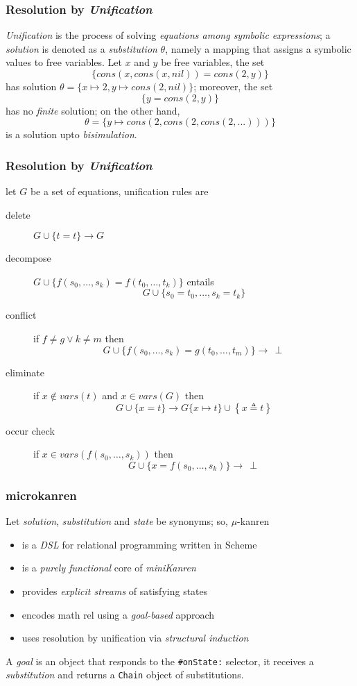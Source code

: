 \documentclass{beamer}
\begin{document}
\begin{frame}[fragile]
\frametitle{Resolution by \textit{Unification}}

\textit{Unification} is the process of solving \textit{equations among symbolic
expressions}; a \textit{solution} is denoted as a \textit{substitution}
$\theta$, namely a mapping that assigns a symbolic values to free variables.
\vfill
Let $x$ and $y$ be free variables, the set
$$\lbrace cons(x,cons(x,nil)) = cons(2,y)\rbrace$$
has solution $\theta = \lbrace x \mapsto 2, y \mapsto cons(2,nil) \rbrace$;
moreover, the set
$$ \lbrace y = cons(2,y) \rbrace $$
has no \textit{finite} solution; on the other hand,
$$\theta = \lbrace y \mapsto cons(2,cons(2,cons(2,...))) \rbrace$$
is a solution upto \textit{bisimulation}.
\end{frame}

\begin{frame}[fragile]
\frametitle{Resolution by \textit{Unification}}
let $G$ be a set of equations, unification rules are
\begin{description}
\item[delete] $G \cup \lbrace t = t \rbrace \rightarrow G$
\item[decompose] $G \cup \lbrace f(s_{0}, \ldots, s_{k}) = f(t_{0}, \ldots, t_{k})\rbrace$ entails
$$G \cup \lbrace s_{0}=t_{0},\ldots, s_{k}=t_{k} \rbrace$$
\item[conflict] if $f\neq g \vee k\neq m$ then $$G \cup \lbrace f(s_{0}, \ldots, s_{k}) = g(t_{0}, \ldots, t_{m})\rbrace \rightarrow \,\perp$$
\item[eliminate] if $x \not\in vars(t)$ and $x \in vars(G)$ then $$G \cup \lbrace x = t\rbrace \rightarrow G\lbrace x \mapsto t\rbrace \cup \left\lbrace x \triangleq t\right\rbrace $$
\item[occur check] if $x \in vars(f(s_{0},\ldots,s_{k}))$ then $$G \cup \lbrace x = f(s_{0}, \ldots, s_{k})\rbrace \rightarrow \,\perp$$
\end{description}
\end{frame}

\begin{frame}[fragile]
\frametitle{microkanren}
Let \textit{solution}, \textit{substitution} and \textit{state} be synonyms; so, $\mu$-kanren
\begin{itemize}
\item is a \textit{DSL} for relational programming written in Scheme
\item is a \textit{purely functional} core of \textit{miniKanren}
\item provides \textit{explicit streams} of satisfying states
\item encodes math rel using a \textit{goal-based} approach
\item uses resolution by unification via \textit{structural induction}
\end{itemize}
\vfill
A \textit{goal} is an object that responds to the \verb|#onState:| selector, it
receives a \textit{substitution} and returns a \verb|Chain| object of
substitutions.
\end{frame}
\end{document}
